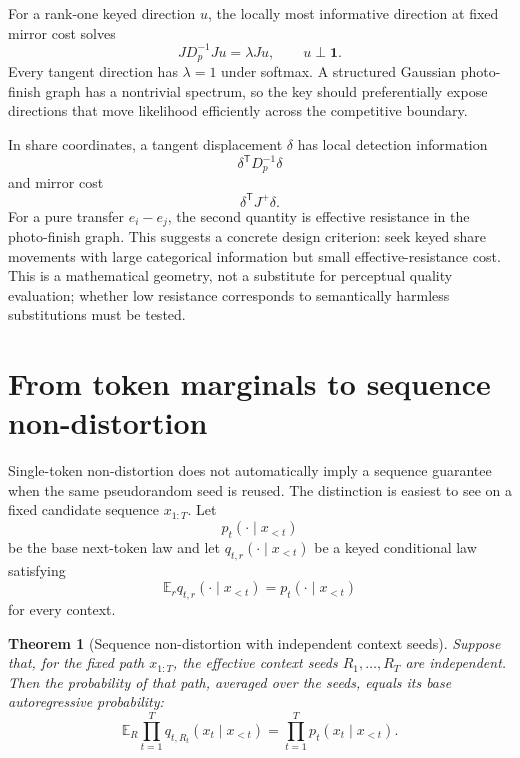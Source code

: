 \documentclass[11pt]{article}
\newtheorem{theorem}{Theorem}[section]
\theoremstyle{definition}
\theoremstyle{remark}
\newcommand{\E}{\mathbb{E}}
\newcommand{\one}{\mathbf{1}}
\newcommand{\Dp}{D_p}
\newcommand{\trans}{\mathsf{T}}
\begin{document}
For a rank-one keyed direction $u$, the locally most informative direction at fixed mirror cost solves
\begin{equation}
J\Dp^{-1}Ju=\lambda Ju,
\qquad u\perp\one.
\label{eq:generalized-eigenproblem}
\end{equation}
Every tangent direction has $\lambda=1$ under softmax. A structured Gaussian photo-finish graph has a nontrivial spectrum, so the key should preferentially expose directions that move likelihood efficiently across the competitive boundary.

In share coordinates, a tangent displacement $\delta$ has local detection information
\begin{equation}
\delta^\trans\Dp^{-1}\delta
\label{eq:share-fisher}
\end{equation}
and mirror cost
\begin{equation}
\delta^\trans J^+\delta.
\label{eq:share-resistance}
\end{equation}
For a pure transfer $e_i-e_j$, the second quantity is effective resistance in the photo-finish graph. This suggests a concrete design criterion: seek keyed share movements with large categorical information but small effective-resistance cost. This is a mathematical geometry, not a substitute for perceptual quality evaluation; whether low resistance corresponds to semantically harmless substitutions must be tested.

\section{From token marginals to sequence non-distortion}
\label{sec:sequence}

Single-token non-distortion does not automatically imply a sequence guarantee when the same pseudorandom seed is reused. The distinction is easiest to see on a fixed candidate sequence $x_{1:T}$. Let
\begin{equation}
p_t(\cdot\mid x_{<t})
\end{equation}
be the base next-token law and let $q_{t,r}(\cdot\mid x_{<t})$ be a keyed conditional law satisfying
\begin{equation}
\E_r q_{t,r}(\cdot\mid x_{<t})=p_t(\cdot\mid x_{<t})
\label{eq:contextwise-nondist}
\end{equation}
for every context.

\begin{theorem}[Sequence non-distortion with independent context seeds]
\label{thm:sequence-nondist}
Suppose that, for the fixed path $x_{1:T}$, the effective context seeds $R_1,\ldots,R_T$ are independent. Then the probability of that path, averaged over the seeds, equals its base autoregressive probability:
\begin{equation}
\E_R\prod_{t=1}^T q_{t,R_t}(x_t\mid x_{<t})
=\prod_{t=1}^T p_t(x_t\mid x_{<t}).
\label{eq:sequence-product}
\end{equation}
\end{theorem}
\end{document}
